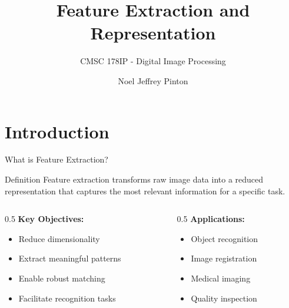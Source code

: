 \documentclass[aspectratio=169,10pt]{beamer}
\title{Feature Extraction and Representation}
\subtitle{CMSC 178IP - Digital Image Processing}
\author{Noel Jeffrey Pinton}
\institute{University of the Philippines - Cebu\\Department of Computer Science}
\date{}
\begin{document}
\maketitle

\section{Introduction}

\begin{frame}{What is Feature Extraction?}
    \begin{alertblock}{Definition}
        Feature extraction transforms raw image data into a reduced representation that captures the most relevant information for a specific task.
    \end{alertblock}

    \begin{columns}[c]
        \begin{column}{0.5\textwidth}
            \textbf{Key Objectives:}
            \begin{itemize}
                \item Reduce dimensionality
                \item Extract meaningful patterns
                \item Enable robust matching
                \item Facilitate recognition tasks
            \end{itemize}
        \end{column}
        \begin{column}{0.5\textwidth}
            \textbf{Applications:}
            \begin{itemize}
                \item Object recognition
                \item Image registration
                \item Medical imaging
                \item Quality inspection
            \end{itemize}
        \end{column}
    \end{columns}
\end{frame}
\end{document}
